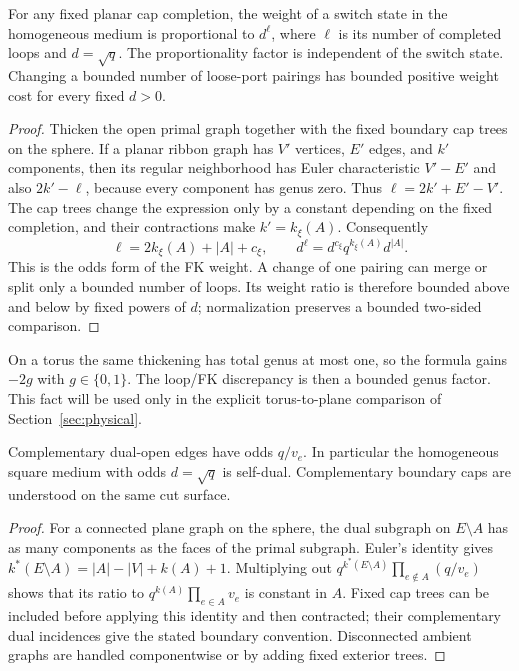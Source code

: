 \begin{lemma}\label{lem:loop-law}
For any fixed planar cap completion, the weight of a switch state in
the homogeneous medium is proportional to $d^{\ell}$, where $\ell$
is its number of completed loops and $d=\sqrt q$.
The proportionality factor is independent of the switch state.
Changing a bounded number of loose-port pairings has bounded positive
weight cost for every fixed $d>0$.
\end{lemma}
\begin{proof}
Thicken the open primal graph together with the fixed boundary cap
trees on the sphere. If a planar ribbon graph has $V'$ vertices,
$E'$ edges, and $k'$ components, then its regular neighborhood has
Euler characteristic $V'-E'$ and also $2k'-\ell$, because every
component has genus zero. Thus $\ell=2k'+E'-V'$.
The cap trees change the expression only by a constant depending on
the fixed completion, and their contractions make $k'=k_\xi(A)$.
Consequently
\[
 \ell=2k_\xi(A)+|A|+c_\xi,
 \qquad
 d^\ell=d^{c_\xi}q^{k_\xi(A)}d^{|A|}.
\]
This is the odds form of the FK weight. A change of one pairing can
merge or split only a bounded number of loops. Its weight ratio is
therefore bounded above and below by fixed powers of $d$; normalization
preserves a bounded two-sided comparison.
\end{proof}

On a torus the same thickening has total genus at most one, so the
formula gains $-2g$ with $g\in\{0,1\}$. The loop/FK discrepancy is
then a bounded genus factor. This fact will be used only in the
explicit torus-to-plane comparison of Section~\ref{sec:physical}.

\begin{lemma}\label{lem:finite-duality}
Complementary dual-open edges have odds $q/v_e$. In particular the
homogeneous square medium with odds $d=\sqrt q$ is self-dual.
Complementary boundary caps are understood on the same cut surface.
\end{lemma}
\begin{proof}
For a connected plane graph on the sphere, the dual subgraph on
$E\setminus A$ has as many components as the faces of the primal
subgraph. Euler's identity gives
$k^*(E\setminus A)=|A|-|V|+k(A)+1$.
Multiplying out $q^{k^*(E\setminus A)}
\prod_{e\notin A}(q/v_e)$ shows that its ratio to
$q^{k(A)}\prod_{e\in A}v_e$ is constant in $A$.
Fixed cap trees can be included before applying this identity and
then contracted; their complementary dual incidences give the stated
boundary convention. Disconnected ambient graphs are handled
componentwise or by adding fixed exterior trees.
\end{proof}

